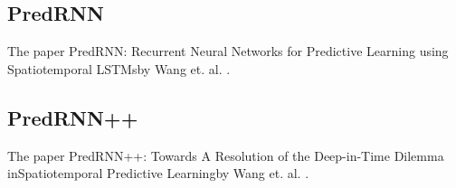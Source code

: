  
 \subsection{PredRNN}
  The paper \glqq PredRNN: Recurrent Neural Networks for Predictive Learning using Spatiotemporal LSTMs\grqq by Wang et. al. \cite{Wang2017}.
 
 \subsection{PredRNN++}
  The paper \glqq PredRNN++: Towards A Resolution of the Deep-in-Time Dilemma inSpatiotemporal Predictive Learning\grqq by Wang et. al. \cite{Wang2018}.